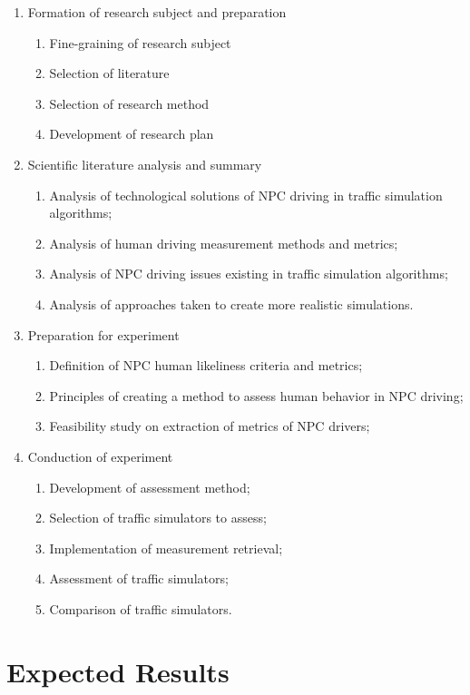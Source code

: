 \documentclass{VUMIFPS-master-intro}
\begin{document}
\begin{enumerate}
	\item Formation of research subject and preparation
		\begin{enumerate}
			\item Fine-graining of research subject
			\item Selection of literature
			\item Selection of research method
			\item Development of research plan
		\end{enumerate}
	\item Scientific literature analysis and summary
		\begin{enumerate}
			\item Analysis of technological solutions of NPC driving in traffic simulation algorithms;
			\item Analysis of human driving measurement methods and metrics;
			\item Analysis of NPC driving issues existing in traffic simulation algorithms;
			\item Analysis of approaches taken to create more realistic simulations.
		\end{enumerate}
	\item Preparation for experiment
		\begin{enumerate}
			\item Definition of NPC human likeliness criteria and metrics;
			\item Principles of creating a method to assess human behavior in NPC driving;
			\item Feasibility study on extraction of metrics of NPC drivers;
		\end{enumerate}
	\item Conduction of experiment
		\begin{enumerate}
			\item Development of assessment method;
			\item Selection of traffic simulators to assess;
			\item Implementation of measurement retrieval;
			\item Assessment of traffic simulators;
			\item Comparison of traffic simulators.
		\end{enumerate}
\end{enumerate}


\section{Expected Results}
\end{document}
